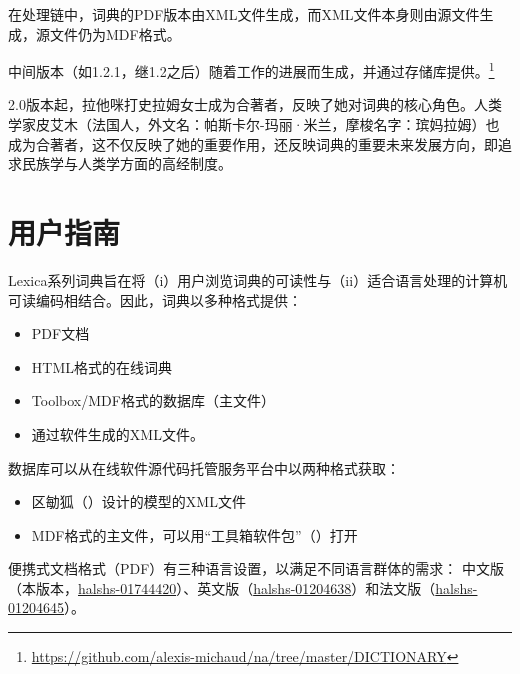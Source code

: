 在处理链中，词典的PDF版本由XML文件生成，而XML文件本身则由源文件生成，源文件仍为MDF格式。

中间版本（如1.2.1，继1.2之后）随着工作的进展而生成，并通过存储库提供。\footnote{\url{https://github.com/alexis-michaud/na/tree/master/DICTIONARY}}

2.0版本起，拉他咪打史拉姆女士成为合著者，反映了她对词典的核心角色。人类学家皮艾木（法国人，外文名：帕斯卡尔-玛丽·米兰，摩梭名字：瑸妈拉姆）也成为合著者，这不仅反映了她的重要作用，还反映词典的重要未来发展方向，即追求民族学与人类学方面的高经制度。





\section{用户指南}
\label{sec:guide}

Lexica系列词典旨在将（i）用户浏览词典的可读性与（ii）适合语言处理的计算机可读编码相结合。因此，词典以多种格式提供：
\begin{itemize}
    \item PDF文档
    \item HTML格式的在线词典
    \item Toolbox/MDF格式的数据库（主文件）
    \item 通过软件生成的XML文件。
\end{itemize}

数据库可以从在线软件源代码托管服务平台中以两种格式获取：

\begin{itemize}
    \item 区勄狐（）设计的模型的XML文件
    \item MDF格式的主文件，可以用“工具箱软件包”（）打开
\end{itemize}

便携式文档格式（PDF）有三种语言设置，以满足不同语言群体的需求： 中文版（本版本，\href{https://shs.hal.science/halshs-01744420}{halshs-01744420}）、英文版（\href{https://shs.hal.science/halshs-01204638}{halshs-01204638}）和法文版（\href{https://shs.hal.science/halshs-01204645/}{halshs-01204645}）。

